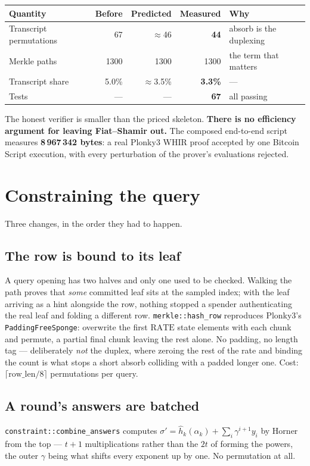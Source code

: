 \documentclass[11pt,a4paper]{article}
\begin{document}
\begin{center}\small
\begin{tabular}{@{}lrrrp{4.8cm}@{}}
\toprule
\textbf{Quantity} & \textbf{Before} & \textbf{Predicted} & \textbf{Measured} & \textbf{Why}\\
\midrule
Transcript permutations & 67 & $\approx$46 & \textbf{44} & absorb is the duplexing\\
Merkle paths            & 1300 & 1300 & 1300 & the term that matters\\
Transcript share        & 5.0\% & $\approx$3.5\% & \textbf{3.3\%} & ---\\
Tests                   & --- & --- & \textbf{67} & all passing\\
\bottomrule
\end{tabular}
\end{center}

The honest verifier is smaller than the priced skeleton. \textbf{There is no efficiency argument for
leaving Fiat--Shamir out.} The composed end-to-end script measures \textbf{8\,967\,342 bytes}: a
real Plonky3 WHIR proof accepted by one Bitcoin Script execution, with every perturbation of the
prover's evaluations rejected.

\section{Constraining the query}\label{sec:constrain}

Three changes, in the order they had to happen.

\subsection*{The row is bound to its leaf}
A query opening has two halves and only one used to be checked. Walking the path proves that
\emph{some} committed leaf sits at the sampled index; with the leaf arriving as a hint alongside the
row, nothing stopped a spender authenticating the real leaf and folding a different row.
\texttt{merkle::hash\_row} reproduces Plonky3's \texttt{PaddingFreeSponge}: overwrite the first
$\mathrm{RATE}$ state elements with each chunk and permute, a partial final chunk leaving the rest
alone. No padding, no length tag --- deliberately \emph{not} the duplex, where zeroing the rest of
the rate and binding the count is what stops a short absorb colliding with a padded longer one.
Cost: $\lceil \mathrm{row\_len}/8\rceil$ permutations per query.

\subsection*{A round's answers are batched}
\texttt{constraint::combine\_answers} computes $\sigma'=\hat h_{k}(\alpha_{k})+\sum_{i}\gamma^{i+1}y_{i}$
by Horner from the top --- $t+1$ multiplications rather than the $2t$ of forming the powers, the
outer $\gamma$ being what shifts every exponent up by one. No permutation at all.
\end{document}
